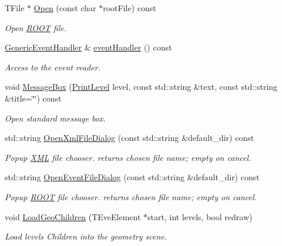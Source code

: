 \begin{DoxyCompactItemize}
T\+File $\ast$ \hyperlink{class_d_d4hep_1_1_display_a661372cb8843f65c1fcf76fc0591885f}{Open} (const char $\ast$root\+File) const
\begin{DoxyCompactList}\small\item\em Open \hyperlink{namespace_r_o_o_t}{R\+O\+OT} file. \end{DoxyCompactList}\item 
\hyperlink{class_d_d4hep_1_1_generic_event_handler}{Generic\+Event\+Handler} \& \hyperlink{class_d_d4hep_1_1_display_acac8dcc69fc7ad0dc872c9a26ccaea76}{event\+Handler} () const
\begin{DoxyCompactList}\small\item\em Access to the event reader. \end{DoxyCompactList}\item 
void \hyperlink{class_d_d4hep_1_1_display_aa34d0301bd5a0870194b8b8271c1d5ce}{Message\+Box} (\hyperlink{namespace_d_d4hep_a5b5a64d56252469451f2020a27d57d42}{Print\+Level} level, const std\+::string \&text, const std\+::string \&title=\char`\"{}\char`\"{}) const
\begin{DoxyCompactList}\small\item\em Open standard message box. \end{DoxyCompactList}\item 
std\+::string \hyperlink{class_d_d4hep_1_1_display_a9dd5c9d27bcea4eceb79b2f88db03e32}{Open\+Xml\+File\+Dialog} (const std\+::string \&default\+\_\+dir) const
\begin{DoxyCompactList}\small\item\em Popup \hyperlink{namespace_d_d4hep_1_1_x_m_l}{X\+ML} file chooser. returns chosen file name; empty on cancel. \end{DoxyCompactList}\item 
std\+::string \hyperlink{class_d_d4hep_1_1_display_a89d76da3081a854a1a4a44dc6aec26eb}{Open\+Event\+File\+Dialog} (const std\+::string \&default\+\_\+dir) const
\begin{DoxyCompactList}\small\item\em Popup \hyperlink{namespace_r_o_o_t}{R\+O\+OT} file chooser. returns chosen file name; empty on cancel. \end{DoxyCompactList}\item 
void \hyperlink{class_d_d4hep_1_1_display_a4432cbc091804b89436dd88dff8484f9}{Load\+Geo\+Children} (T\+Eve\+Element $\ast$start, int levels, bool redraw)
\begin{DoxyCompactList}\small\item\em Load \textquotesingle{}levels\textquotesingle{} Children into the geometry scene. \end{DoxyCompactList}\item 

\end{DoxyCompactItemize}
